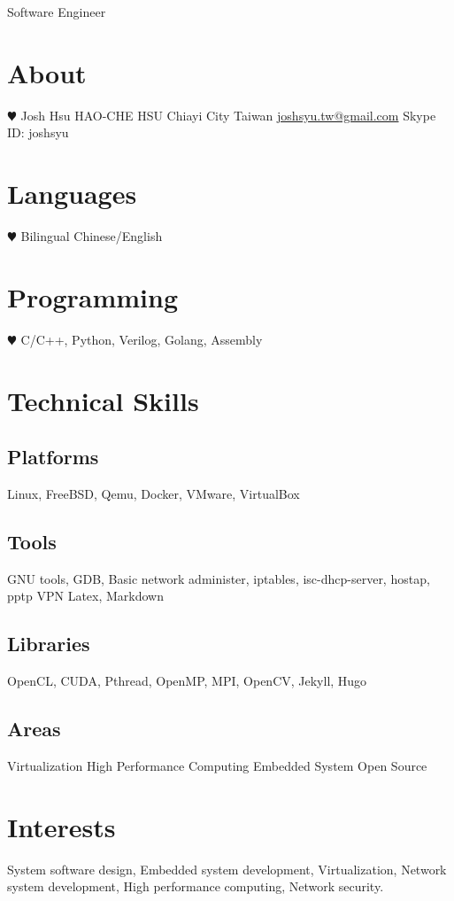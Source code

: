 \documentclass[]{friggeri-cv}
\begin{document}
       {Software Engineer}


\begin{aside}
  \section{About}
    {\color{red} $\varheartsuit$} 
    Josh Hsu
    HAO-CHE HSU
	Chiayi City
    Taiwan
	\href{joshsyu.tw@gmail.com}{joshsyu.tw@gmail.com}
	Skype ID: joshsyu
  \section{Languages}
    {\color{red} $\varheartsuit$} 
  	Bilingual Chinese/English
  \section{Programming}
    {\color{red} $\varheartsuit$} 
	C/C++, Python, Verilog, Golang, Assembly 
  \section{Technical Skills}
  \subsection{Platforms}
	Linux, FreeBSD, Qemu, Docker, VMware, VirtualBox
  \subsection{Tools}
	GNU tools, GDB, Basic network administer, 
	iptables, isc-dhcp-server, hostap, pptp VPN
	Latex, Markdown
  \subsection{Libraries}
	OpenCL, CUDA, Pthread, OpenMP, MPI, OpenCV, Jekyll, Hugo
  \subsection{Areas}
	Virtualization
	High Performance Computing
	Embedded System
	Open Source
\end{aside}

\section{Interests}

System software design, Embedded system development,
Virtualization, Network system development, High performance computing,
Network security.
\end{document}
